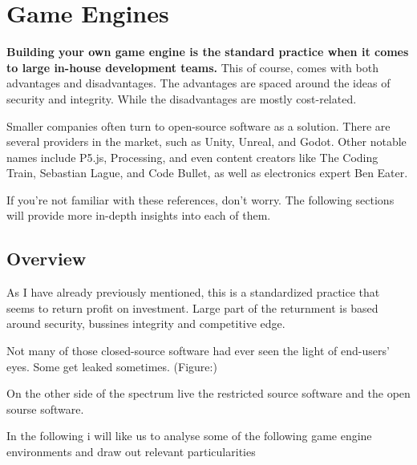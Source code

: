 
\chapter*{Game Engines}
  \textbf{Building your own game engine is the standard practice when it comes to large in-house development teams.}
  This of course, comes with both advantages and disadvantages.
  The advantages are spaced around the ideas of security and integrity.
  While the disadvantages are mostly cost-related.

  Smaller companies often turn to open-source software as a solution. There are several providers in the market, such as Unity, Unreal, and Godot. Other notable names include P5.js, Processing, and even content creators like The Coding Train, Sebastian Lague, and Code Bullet, as well as electronics expert Ben Eater.

  If you're not familiar with these references, don't worry. The following sections will provide more in-depth insights into each of them.

  \section*{Overview}

  As I have already previously mentioned, this is a standardized practice that seems to return profit on investment.
  Large part of the returnment is based around security, bussines integrity and competitive edge.
  
  Not many of those closed-source software had ever seen the light of end-users' eyes. Some get leaked sometimes. (Figure:)


  On the other side of the spectrum live the restricted source software and the open sourse software.

  In the following i will like us to analyse some of the following game engine environments and draw out relevant particularities



    






